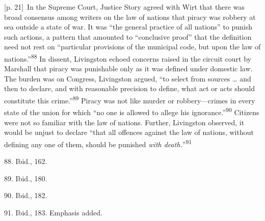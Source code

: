 \documentclass[10pt,a4paper]{article}
\begin{document}
{\scriptsize\color{gray} [p. 21]}\ In the Supreme Court, Justice Story agreed with Wirt that there was broad consensus among writers on the law of nations that piracy was robbery at sea outside a state of war. It was “the general practice of all nations” to punish such actions, a pattern that amounted to “conclusive proof” that the definition need not rest on “particular provisions of the municipal code, but upon the law of nations.”\nobreak\textsuperscript{88} In dissent, Livingston echoed concerns raised in the circuit court by Marshall that piracy was punishable only as it was defined under domestic law. The burden was on Congress, Livingston argued, “to select from sources … and then to declare, and with reasonable precision to define, what act or acts should constitute this crime.”\nobreak\textsuperscript{89} Piracy was not like murder or robbery—crimes in every state of the union for which “no one is allowed to allege his ignorance.”\nobreak\textsuperscript{90} Citizens were not so familiar with the law of nations. Further, Livingston observed, it would be unjust to declare “that all offences against the law of nations, without defining any one of them, should be punished \textit{with death.}”\nobreak\textsuperscript{91}\par{\small 88. Ibid., 162.\par}{\small 89. Ibid., 180.\par}{\small 90. Ibid., 182.\par}{\small 91. Ibid., 183. Emphasis added.\par}
\end{document}
